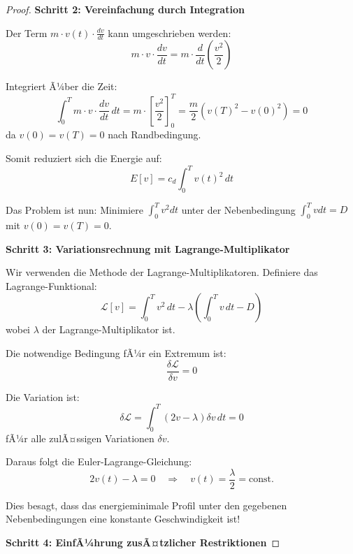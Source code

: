 ﻿\documentclass[a4paper,12pt]{article}
\theoremstyle{definition}
\begin{document}
\begin{proof}
\textbf{Schritt 2: Vereinfachung durch Integration}

Der Term $m \cdot v(t) \cdot \frac{dv}{dt}$ kann umgeschrieben werden:
\begin{equation}
m \cdot v \cdot \frac{dv}{dt} = m \cdot \frac{d}{dt}\left(\frac{v^2}{2}\right)
\end{equation}

Integriert Ã¼ber die Zeit:
\begin{equation}
\int_0^T m \cdot v \cdot \frac{dv}{dt} \, dt = m \cdot \left[\frac{v^2}{2}\right]_0^T = \frac{m}{2}(v(T)^2 - v(0)^2) = 0
\end{equation}
da $v(0) = v(T) = 0$ nach Randbedingung.

Somit reduziert sich die Energie auf:
\begin{equation}
E[v] = c_d \int_0^T v(t)^2 \, dt
\end{equation}

Das Problem ist nun: Minimiere $\int_0^T v^2 dt$ unter der Nebenbedingung $\int_0^T v dt = D$ mit $v(0) = v(T) = 0$.

\textbf{Schritt 3: Variationsrechnung mit Lagrange-Multiplikator}

Wir verwenden die Methode der Lagrange-Multiplikatoren. Definiere das Lagrange-Funktional:
\begin{equation}
\mathcal{L}[v] = \int_0^T v^2 \, dt - \lambda \left(\int_0^T v \, dt - D\right)
\end{equation}
wobei $\lambda$ der Lagrange-Multiplikator ist.

Die notwendige Bedingung fÃ¼r ein Extremum ist:
\begin{equation}
\frac{\delta \mathcal{L}}{\delta v} = 0
\end{equation}

Die Variation ist:
\begin{equation}
\delta \mathcal{L} = \int_0^T (2v - \lambda) \delta v \, dt = 0
\end{equation}
fÃ¼r alle zulÃ¤ssigen Variationen $\delta v$.

Daraus folgt die Euler-Lagrange-Gleichung:
\begin{equation}
2v(t) - \lambda = 0 \quad \Rightarrow \quad v(t) = \frac{\lambda}{2} = \text{const.}
\end{equation}

Dies besagt, dass das energieminimale Profil unter den gegebenen Nebenbedingungen eine konstante Geschwindigkeit ist!

\textbf{Schritt 4: EinfÃ¼hrung zusÃ¤tzlicher Restriktionen}


\end{proof}
\end{document}

